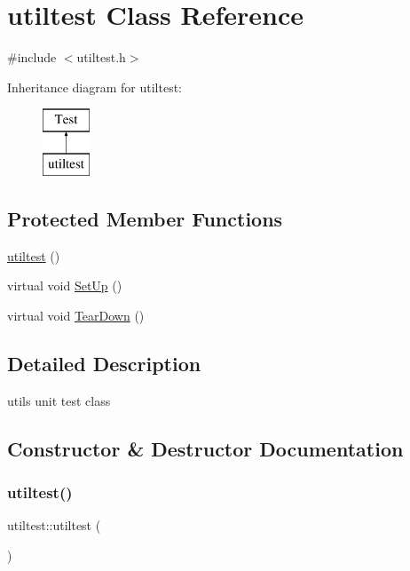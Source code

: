 \hypertarget{classutiltest}{}\section{utiltest Class Reference}
\label{classutiltest}


{\ttfamily \#include $<$utiltest.\+h$>$}

Inheritance diagram for utiltest\+:\begin{figure}[H]
\begin{center}
\leavevmode
\includegraphics[height=2.000000cm]{classutiltest}
\end{center}
\end{figure}
\subsection*{Protected Member Functions}
\begin{DoxyCompactItemize}
\item 
\mbox{\hyperlink{classutiltest_a35f09758f991db463f121f53fe80e13a}{utiltest}} ()
\item 
virtual void \mbox{\hyperlink{classutiltest_afc8b4a31b759240caba5c944d67da4f3}{Set\+Up}} ()
\item 
virtual void \mbox{\hyperlink{classutiltest_afadabc73c18bc9ea33a199f32b296c62}{Tear\+Down}} ()
\end{DoxyCompactItemize}


\subsection{Detailed Description}
utils unit test class 

\subsection{Constructor \& Destructor Documentation}
\mbox{\label{classutiltest_a35f09758f991db463f121f53fe80e13a}} 
\subsubsection{\texorpdfstring{utiltest()}{utiltest()}}
{\footnotesize\ttfamily utiltest\+::utiltest (\begin{DoxyParamCaption}{ }\end{DoxyParamCaption})\hspace{0.3cm}{\ttfamily [protected]}}

